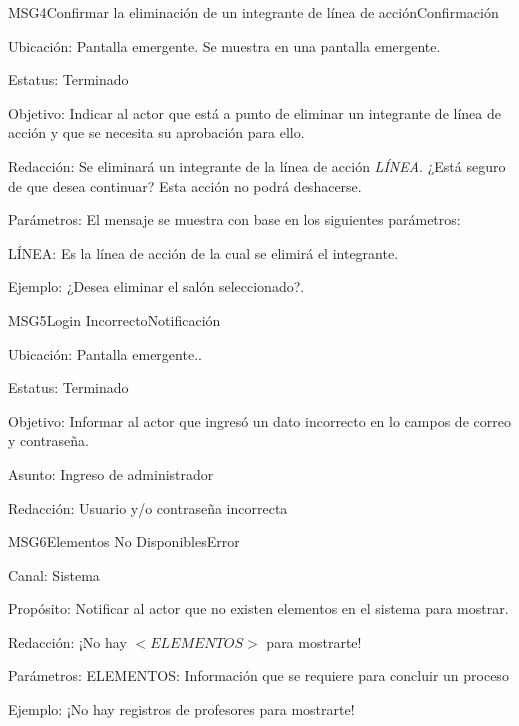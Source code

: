 \begin{mensaje}{MSG4}{Confirmar la eliminación de un integrante de línea de acción}{Confirmación}
    \item[Ubicación:] Pantalla emergente. Se muestra en una pantalla emergente.
    \item[Estatus:] Terminado
    \item[Objetivo:] Indicar al actor que está a punto de eliminar un integrante de línea de acción y que se necesita su aprobación para ello.
    \item[Redacción:] Se eliminará un integrante de la línea de acción \textit{LÍNEA}. ¿Está seguro de que desea continuar? Esta acción no podrá deshacerse.
    \item[Parámetros:] El mensaje se muestra con base en los siguientes parámetros:
    \begin{Citemize}
	\item LÍNEA: Es la línea de acción de la cual se elimirá el integrante.
    \end{Citemize}
    \item[Ejemplo:] ¿Desea eliminar el salón seleccionado?.
\end{mensaje}

\begin{mensaje}{MSG5}{Login Incorrecto}{Notificación}
	\item[Ubicación:] Pantalla emergente..
	\item[Estatus:] Terminado
	\item[Objetivo:] Informar al actor que ingresó un dato incorrecto en lo campos de correo y contraseña.
	\item[Asunto:] Ingreso de administrador
	\item[Redacción:] Usuario y/o contraseña incorrecta
\end{mensaje}

\begin{mensaje}{MSG6}{Elementos No Disponibles}{Error}
	\item[Canal:] Sistema
	\item[Propósito:] Notificar al actor que no existen elementos en el sistema para mostrar.
	\item[Redacción:] ¡No hay $<ELEMENTOS>$ para mostrarte!
	\item[Parámetros:] ELEMENTOS: Información que se requiere para concluir un proceso
	\item[Ejemplo:] ¡No hay registros de profesores para mostrarte!
	
	
\end{mensaje}


